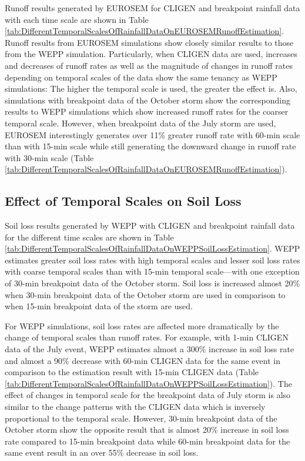 Runoff results generated by EUROSEM for CLIGEN and breakpoint rainfall data with
each time scale are shown in Table
\ref{tab:DifferentTemporalScalesOfRainfallDataOnEUROSEMRunoffEstimation}. Runoff
results from EUROSEM simulations show closely similar results to those from the
WEPP simulation. Particularly, when CLIGEN data are used, increases and
decreases of runoff rates as well as the magnitude of changes in runoff
rates depending on temporal scales of the data show the same tenancy as WEPP
simulations: The higher the temporal scale is used, the greater the effect is.
Also, simulations with breakpoint data of the October storm show the
corresponding results to WEPP simulations which show increased runoff rates for
the coarser temporal scale. However, when breakpoint data of the July storm are
used, EUROSEM interestingly generates over 11\% greater runoff rate with 60-min
scale than with 15-min scale while still generating the downward change in
runoff rate with 30-min scale (Table
\ref{tab:DifferentTemporalScalesOfRainfallDataOnEUROSEMRunoffEstimation}).

\subsection{Effect of Temporal Scales on Soil Loss}
\label{sec:TemporalScalesSimulatedSoilLoss}

Soil loss results generated by WEPP with CLIGEN and breakpoint rainfall data for
the different time scales are shown in Table
\ref{tab:DifferentTemporalScalesOfRainfallDataOnWEPPSoilLossEstimation}. WEPP
estimates greater soil loss rates with high temporal scales and lesser soil loss
rates with coarse temporal scales than with 15-min temporal scale---with one
exception of 30-min breakpoint data of the October storm. Soil loss is increased
almost 20\% when 30-min breakpoint data of the October storm are used in
comparison to when 15-min breakpoint data of the storm are used.

For WEPP simulations, soil loss rates are affected more dramatically by the
change of temporal scales than runoff rates. For example, with 1-min CLIGEN data
of the July event, WEPP estimates almost a 300\% increase in soil loss rate and
almost a 90\% decrease with 60-min CLIGEN data for the same event in comparison
to the estimation result with 15-min CLIGEN data (Table
\ref{tab:DifferentTemporalScalesOfRainfallDataOnWEPPSoilLossEstimation}). The
effect of changes in temporal scale for the breakpoint data of July storm
is also similar to the change patterns with the CLIGEN data which is inversely
proportional to the temporal scale. However, 30-min breakpoint data of the
October storm show the opposite result that is almost 20\% increase in soil loss
rate compared to 15-min breakpoint data while 60-min breakpoint data for the
same event result in an over 55\% decrease in soil loss.

